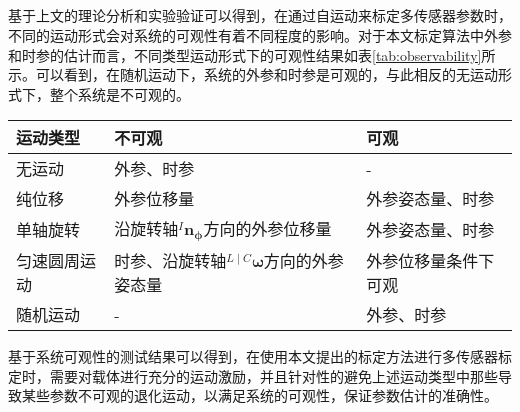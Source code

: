 \subsection{}
基于上文的理论分析和实验验证可以得到，在通过自运动来标定多传感器参数时，不同的运动形式会对系统的可观性有着不同程度的影响。对于本文标定算法中外参和时参的估计而言，不同类型运动形式下的可观性结果如表\ref{tab:observability}所示。可以看到，在随机运动下，系统的外参和时参是可观的，与此相反的无运动形式下，整个系统是不可观的。
\begin{table*}[htbp]
  \centering
  \normf
  \begin{tabular}{l|ll}
    \hline
    {运动类型}     & {不可观}                                                             & {可观}                 \\ \hline
    {无运动}       & {外参、时参}                                                         & {-}                    \\
    {纯位移}       & {外参位移量}                                                         & {外参姿态量、时参}     \\
    {单轴旋转}     & {沿旋转轴${^{I}\boldsymbol{n}_{\boldsymbol{\phi}}}$方向的外参位移量} & {外参姿态量、时参}     \\
    {匀速圆周运动} & {时参、沿旋转轴${^{L\mid C}\boldsymbol{\omega}}$方向的外参姿态量}    & {外参位移量条件下可观} \\
    {随机运动}     & {-}                                                                  & {外参、时参}           \\
    \hline
  \end{tabular}
  \caption{}
  \label{tab:observability}
\end{table*}

基于系统可观性的测试结果可以得到，在使用本文提出的标定方法进行多传感器标定时，需要对载体进行充分的运动激励，并且针对性的避免上述运动类型中那些导致某些参数不可观的退化运动，以满足系统的可观性，保证参数估计的准确性。
